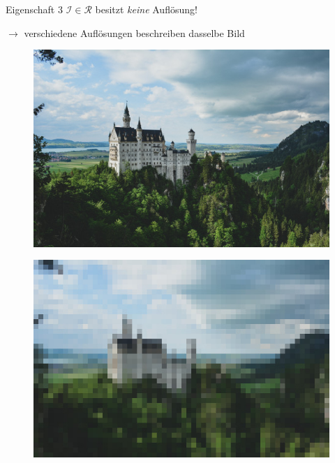 \documentclass[10pt]{beamer}
\begin{document}
\begin{frame}{Eigenschaft 3}
  \( \mathcal{I} \in \mathcal{R} \) besitzt \emph{keine} Auflösung!

  \( \to \) verschiedene Auflösungen beschreiben dasselbe Bild

  \begin{minipage}{.45\textwidth}
    \begin{figure}
      \includegraphics[width=\textwidth]{neuschwanstein}
    \end{figure}
  \end{minipage}
  \hfill
  \begin{minipage}{.45\textwidth}
    \begin{figure}
      \includegraphics[width=\textwidth]{neuschwanstein-pixelated}
    \end{figure}
  \end{minipage}
\end{frame}
\end{document}
